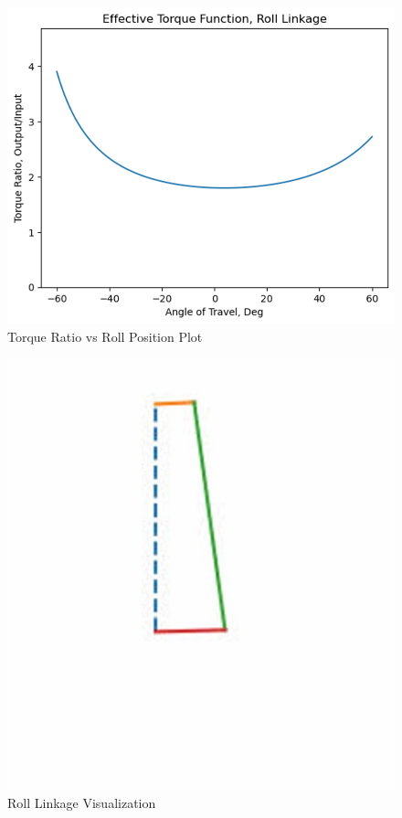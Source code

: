 \documentclass{article}
\begin{document}
\begin{figure}[H]
    \centering
    \includegraphics[scale=0.8]{assets/Design Presentation/Torque Ratio Roll.png}
    \caption{Torque Ratio vs Roll Position Plot}
    \label{fig:enter-label}
\end{figure}

\begin{figure}[H]
    \centering
    \includegraphics[scale=0.8]{assets/Design Presentation/Roll_viz.jpg}
    \caption{Roll Linkage Visualization}
    \label{fig:enter-label}
\end{figure}
\end{document}
